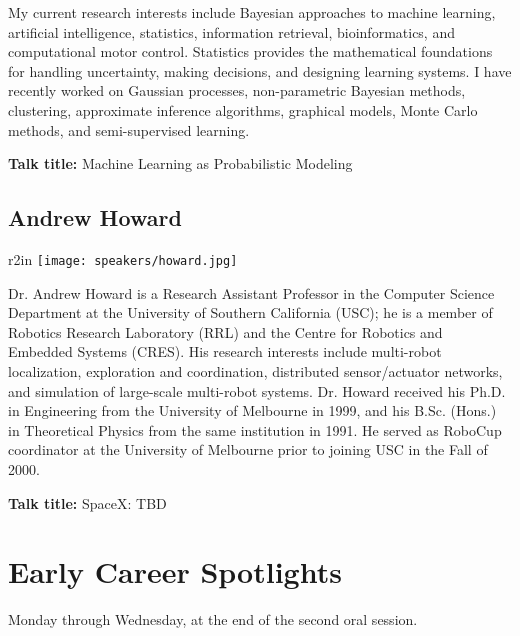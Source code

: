 My current research interests include Bayesian approaches to machine learning, artificial intelligence, statistics, information retrieval, bioinformatics, and computational motor control. Statistics provides the mathematical foundations for handling uncertainty, making decisions, and designing learning systems. I have recently worked on Gaussian processes, non-parametric Bayesian methods, clustering, approximate inference algorithms, graphical models, Monte Carlo methods, and semi-supervised learning.

\bigskip
{\bf Talk title:} Machine Learning as Probabilistic Modeling

\newpage
\subsection*{Andrew Howard}
\begin{wrapfigure}{r}{2in}
\centering
\texttt{[image: speakers/howard.jpg]}
\end{wrapfigure}

Dr. Andrew Howard is a Research Assistant Professor in the Computer Science Department at the University of Southern California (USC); he is a member of Robotics Research Laboratory (RRL) and the Centre for Robotics and Embedded Systems (CRES). His research interests include multi-robot localization, exploration and coordination, distributed sensor/actuator networks, and simulation of large-scale multi-robot systems. Dr. Howard received his Ph.D. in Engineering from the University of Melbourne in 1999, and his B.Sc. (Hons.) in Theoretical Physics from the same institution in 1991. He served as RoboCup coordinator at the University of Melbourne prior to joining USC in the Fall of 2000.

\bigskip
{\bf Talk title: } SpaceX: TBD

\bigskip

\bigskip

\bigskip

\bigskip

\bigskip

\bigskip


\bigskip





\section*{Early Career Spotlights}
\label{career_talks}

Monday through Wednesday, at the end of the second oral session.

